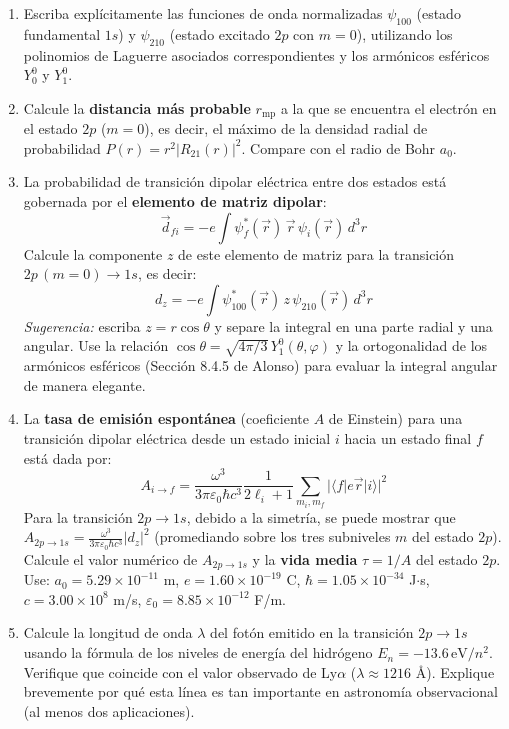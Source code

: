 \documentclass[a4paper]{article}
\begin{document}
\begin{enumerate}[label=\alph*)]
\item Escriba explícitamente las funciones de onda normalizadas $\psi_{100}$ (estado fundamental $1s$) y $\psi_{210}$ (estado excitado $2p$ con $m=0$), utilizando los polinomios de Laguerre asociados correspondientes y los armónicos esféricos $Y_0^0$ y $Y_1^0$.

\item Calcule la \textbf{distancia más probable} $r_{\text{mp}}$ a la que se encuentra el electrón en el estado $2p$ ($m=0$), es decir, el máximo de la densidad radial de probabilidad $P(r) = r^2 |R_{21}(r)|^2$. Compare con el radio de Bohr $a_0$.

\item La probabilidad de transición dipolar eléctrica entre dos estados está gobernada por el \textbf{elemento de matriz dipolar}:
$$
\vec{d}_{fi} = -e \int \psi_f^*(\vec{r})\, \vec{r}\, \psi_i(\vec{r})\, d^3r
$$
Calcule la componente $z$ de este elemento de matriz para la transición $2p\,(m=0) \to 1s$, es decir:
$$
d_z = -e \int \psi_{100}^*(\vec{r})\, z\, \psi_{210}(\vec{r})\, d^3r
$$
\textit{Sugerencia:} escriba $z = r\cos\theta$ y separe la integral en una parte radial y una angular. Use la relación $\cos\theta = \sqrt{4\pi/3}\, Y_1^0(\theta,\varphi)$ y la ortogonalidad de los armónicos esféricos (Sección 8.4.5 de Alonso) para evaluar la integral angular de manera elegante.

\item La \textbf{tasa de emisión espontánea} (coeficiente $A$ de Einstein) para una transición dipolar eléctrica desde un estado inicial $i$ hacia un estado final $f$ está dada por:
$$
A_{i \to f} = \frac{\omega^3}{3\pi \varepsilon_0 \hbar c^3} \frac{1}{2\ell_i+1} \sum_{m_i, m_f} |\langle f | e\vec{r} | i \rangle|^2
$$
Para la transición $2p \to 1s$, debido a la simetría, se puede mostrar que $A_{2p \to 1s} = \frac{\omega^3}{3\pi \varepsilon_0 \hbar c^3} |d_z|^2$ (promediando sobre los tres subniveles $m$ del estado $2p$). Calcule el valor numérico de $A_{2p \to 1s}$ y la \textbf{vida media} $\tau = 1/A$ del estado $2p$. Use: $a_0 = 5.29 \times 10^{-11}$ m, $e = 1.60 \times 10^{-19}$ C, $\hbar = 1.05 \times 10^{-34}$ J$\cdot$s, $c = 3.00 \times 10^8$ m/s, $\varepsilon_0 = 8.85 \times 10^{-12}$ F/m.

\item Calcule la longitud de onda $\lambda$ del fotón emitido en la transición $2p \to 1s$ usando la fórmula de los niveles de energía del hidrógeno $E_n = -13.6\,\text{eV}/n^2$. Verifique que coincide con el valor observado de Ly$\alpha$ ($\lambda \approx 1216$ \AA). Explique brevemente por qué esta línea es tan importante en astronomía observacional (al menos dos aplicaciones).
\end{enumerate}
\end{document}
